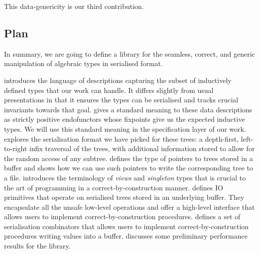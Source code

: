 
This data-genericity is our third contribution.

\subsection{Plan}

In summary, we are going to define a library for the
seamless,
correct,
and generic
manipulation of algebraic types in serialised format.


 introduces the language of descriptions capturing the
subset of inductively defined types that our work can handle.
It differs slightly from usual presentations in that it ensures the
types can be serialised and tracks crucial invariants towards that goal.
%
 gives a standard meaning to these data descriptions
as strictly positive endofunctors whose fixpoints give us the expected
inductive types.
%
We will use this standard meaning in the specification layer of our work.
%
 explores the serialisation format we have picked
for these trees: a depth-first, left-to-right infix traversal of the
trees, with additional information stored to allow for the random access
of any subtree.
%
 defines the type of pointers to trees stored in a
buffer and shows how we can use such pointers to write the corresponding
tree to a file.
%
 introduces the terminology of \emph{views} and
\emph{singleton} types that is crucial to the art of programming
in a correct-by-construction manner.
%
 defines IO primitives that operate on serialised
trees stored in an underlying buffer.
%
They encapsulate all the unsafe low-level operations and offer a
high-level interface that allows users to implement correct-by-construction
procedures.
%
 defines a set of serialisation combinators that
allows users to implement correct-by-construction procedures writing
values into a buffer.
%
 discusses some preliminary performance results for
the library.
